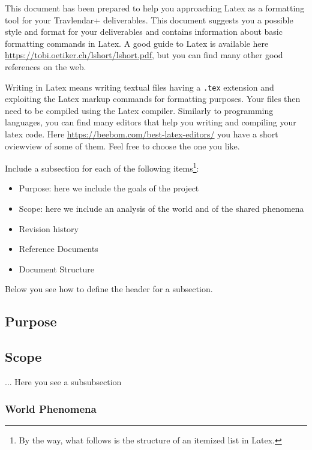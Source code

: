 This document has been prepared to help you approaching Latex as a formatting tool for your Travlendar+ deliverables. This document suggests you a possible style and format for your deliverables and contains information about basic formatting commands in Latex. A good guide to Latex is available here \href{https://tobi.oetiker.ch/lshort/lshort.pdf}{https://tobi.oetiker.ch/lshort/lshort.pdf}, but you can find many other good references on the web.

Writing in Latex means writing textual files having a \texttt{.tex} extension and exploiting the Latex markup commands for formatting purposes. Your files then need to be compiled using the Latex compiler. Similarly to programming languages, you can find many editors that help you writing and compiling your latex code. Here \href{https://beebom.com/best-latex-editors/}{https://beebom.com/best-latex-editors/} you have a short oviewview of some of them. Feel free to choose the one you like.

Include a subsection for each of the following items\footnote{By the way, what follows is the structure of an itemized list in Latex.}:
\begin{itemize}
    \item
          Purpose: here we include the goals of the project
    \item
          Scope: here we include an analysis of the world and of the shared phenomena
    \item
          Revision history
    \item
          Reference Documents
    \item
          Document Structure
\end{itemize}
Below you see how to define the header for a subsection.
\subsection{Purpose}
\subsection{Scope}
... Here you see a subsubsection
\subsubsection{World Phenomena}
